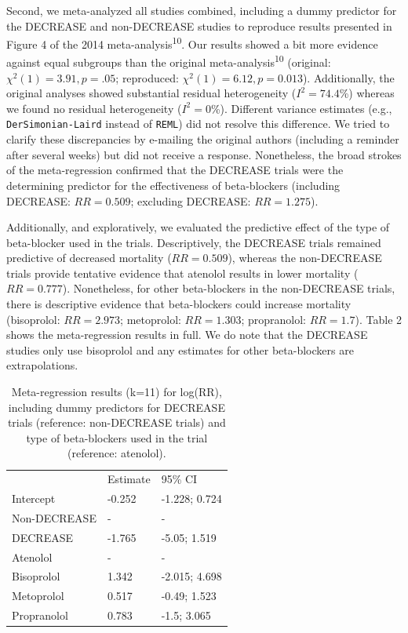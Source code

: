 \documentclass[]{article}
\begin{document}
Second, we meta-analyzed all studies combined, including a dummy
predictor for the DECREASE and non-DECREASE studies to reproduce results
presented in Figure 4 of the 2014 meta-analysis\textsuperscript{10}. Our
results showed a bit more evidence against equal subgroups than the
original meta-analysis\textsuperscript{10} (original:
\(\chi^2(1)=3.91,p=.05\); reproduced: \(\chi^2(1)=6.12,p=0.013\)).
Additionally, the original analyses showed substantial residual
heterogeneity (\(I^2=74.4\)\%) whereas we found no residual
heterogeneity (\(I^2=0\)\%). Different variance estimates (e.g.,
\texttt{DerSimonian-Laird} instead of \texttt{REML}) did not resolve
this difference. We tried to clarify these discrepancies by e-mailing
the original authors (including a reminder after several weeks) but did
not receive a response. Nonetheless, the broad strokes of the
meta-regression confirmed that the DECREASE trials were the determining
predictor for the effectiveness of beta-blockers (including DECREASE:
\(RR=0.509\); excluding DECREASE: \(RR=1.275\)).

Additionally, and exploratively, we evaluated the predictive effect of
the type of beta-blocker used in the trials. Descriptively, the DECREASE
trials remained predictive of decreased mortality (\(RR=0.509\)),
whereas the non-DECREASE trials provide tentative evidence that atenolol
results in lower mortality (\(RR=0.777\)). Nonetheless, for other
beta-blockers in the non-DECREASE trials, there is descriptive evidence
that beta-blockers could increase mortality (bisoprolol: \(RR=2.973\);
metoprolol: \(RR=1.303\); propranolol: \(RR=1.7\)). Table 2 shows the
meta-regression results in full. We do note that the DECREASE studies
only use bisoprolol and any estimates for other beta-blockers are
extrapolations.

\begin{longtable}[]{@{}lll@{}}
\caption{Meta-regression results (k=11) for log(RR), including dummy
predictors for DECREASE trials (reference: non-DECREASE trials) and type
of beta-blockers used in the trial (reference:
atenolol).}\tabularnewline
\toprule
\begin{minipage}[t]{0.32\columnwidth}\raggedright\strut
\strut
\end{minipage} & \begin{minipage}[t]{0.32\columnwidth}\raggedright\strut
Estimate\strut
\end{minipage} & \begin{minipage}[t]{0.32\columnwidth}\raggedright\strut
95\% CI\strut
\end{minipage}\tabularnewline
Intercept & -0.252 & -1.228; 0.724\tabularnewline
Non-DECREASE & - & -\tabularnewline
DECREASE & -1.765 & -5.05; 1.519\tabularnewline
Atenolol & - & -\tabularnewline
Bisoprolol & 1.342 & -2.015; 4.698\tabularnewline
Metoprolol & 0.517 & -0.49; 1.523\tabularnewline
Propranolol & 0.783 & -1.5; 3.065\tabularnewline
\bottomrule
\end{longtable}
\end{document}
